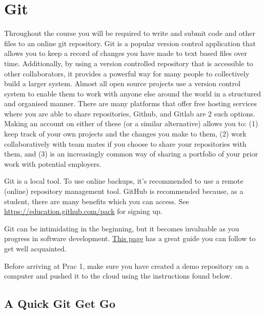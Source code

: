 \section{Git}
\label{sec:Git}
Throughout the course you will be required to write and submit code and other files to an online git repository.  Git is a popular version control application that allows you to keep a record of changes you have made to text based files over time.  Additionally, by using a version controlled repository that is accessible to other collaborators, it provides a powerful way for many people to collectively build a larger system.  Almost all open source projects use a version control system to enable them to work with anyone else around the world in a structured and organised manner.  There are many platforms that offer free hosting services where you are able to share repositories, Github, and Gitlab are 2 such options.  Making an account on either of these (or a similar alternative) allows you to: (1) keep track of your own projects and the changes you make to them, (2) work collaboratively with team mates if you choose to share your repositories with them, and (3) is an increasingly common way of sharing a portfolio of your prior work with potential employers.

Git is a local tool. To use online backups, it's recommended to use a remote (online) repository management tool. GitHub is recommended because, as a student, there are many benefits which you can access. See \href{https://education.github.com/pack}{https://education.github.com/pack} for signing up.

Git can be intimidating in the beginning, but it becomes invaluable as you progress in software development. \href{https://swcarpentry.github.io/git-novice/}{This page} has a great guide you can follow to get well acquainted.

Before arriving at Prac 1, make sure you have created a demo repository on a computer and pushed it to the cloud using the instructions found below.

\subsection{A Quick Git Get Go}
